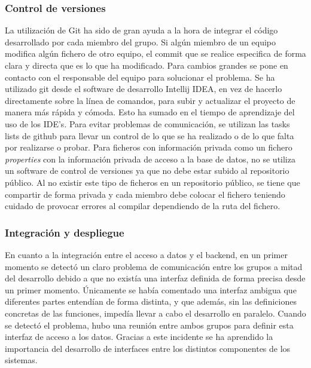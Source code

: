 \subsubsection{Control de versiones}
La utilización de Git ha sido de gran ayuda a la hora de integrar el código desarrollado por cada miembro del grupo. Si algún miembro de un equipo modifica algún fichero de otro equipo, el commit que se realice especifica de forma clara y directa que es lo que ha modificado. Para cambios grandes se pone en contacto con el responsable del equipo para solucionar el problema. Se ha utilizado git desde el software de desarrollo Intellij IDEA, en vez de hacerlo directamente sobre la línea de comandos, para subir y actualizar el proyecto de manera más rápida y cómoda. Esto ha sumado en el tiempo de aprendizaje del uso de los IDE’s. Para evitar problemas de comunicación, se utilizan las tasks lists de github para llevar un control de lo que se ha realizado o de lo que falta por realizarse o probar. Para ficheros con información privada como un fichero \textit{properties} con la información privada de acceso a la base de datos, no se utiliza un software de control de versiones ya que no debe estar subido al repositorio público. Al no existir este tipo de ficheros en un repositorio público, se tiene que compartir de forma privada y cada miembro debe colocar el fichero teniendo cuidado de provocar errores al compilar dependiendo de la ruta del fichero.\\

\subsubsection*{Integración y despliegue}
En cuanto a la integración entre el acceso a datos y el backend, en un primer momento se detectó un claro problema de comunicación entre los grupos a mitad del desarrollo debido a que no existía una interfaz definida de forma precisa desde un primer momento. Únicamente se había comentado una interfaz ambigua que diferentes partes entendían de forma distinta, y que además, sin las definiciones concretas de las funciones, impedía llevar a cabo el desarrollo en paralelo. Cuando se detectó el problema, hubo una reunión entre ambos grupos para definir esta interfaz de acceso a los datos. Gracias a este incidente se ha aprendido la importancia del desarrollo de interfaces entre los distintos componentes de los sistemas.\\

